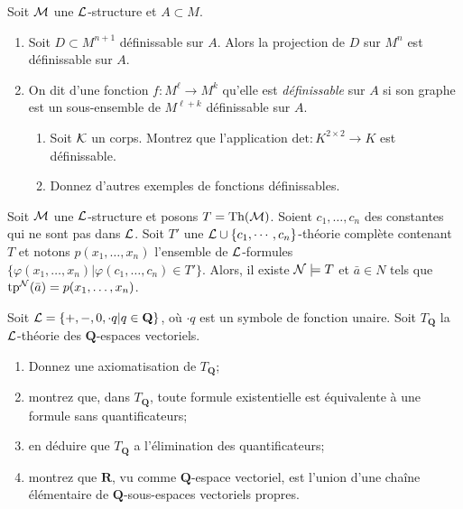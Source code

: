 \documentclass[12pt,a4paper]{exprog}
\renewcommand{\phi}{\varphi}
\begin{document}
\begin{question}
  Soit $\mathcal{M}$ une $\mathcal{L}$-structure et $A\subset M$.
  \begin{enumerate}
  \item Soit $D\subset M^{n+1}$ définissable sur $A$. Alors la projection de $D$
    sur $M^{n}$ est définissable sur $A$.
  \item On dit d'une fonction $f:M^{\ell}\to M^{k}$ qu'elle est
    \emph{définissable} sur $A$ si son graphe est un sous-ensemble de
    $M^{\ell+k}$ définissable sur $A$.
    \begin{enumerate}
    \item Soit $\mathcal{K}$ un corps. Montrez que l'application
      $\text{det}:K^{2\times 2}\to K$ est définissable.
    \item Donnez d'autres exemples de fonctions définissables.
    \end{enumerate}
  \end{enumerate}
\end{question}
\begin{question}
  Soit $\mathcal{M}$ une $\mathcal{L}$-structure et posons $T=\text{Th}(\mathcal{M})$. Soient
  $c_{1},\ldots,c_{n}$ des constantes qui ne sont pas dans $\mathcal{L}$. Soit $T'$ une
  $\mathcal{L}\cup\{c_{1},\cdots,c_{n}\}$-théorie complète contenant $T$ et notons
  $p(x_{1},\ldots,x_{n})$ l'ensemble de $\mathcal{L}$-formules
$\{\phi(x_{1},\ldots,x_{n})|\phi(c_{1},\ldots,c_{n})\in T'\}$. Alors, il existe
$\mathcal{N}\models T$ et $\bar{a}\in N$ tels que $\text{tp}^{\mathcal{N}}(\bar{a})=p(x_{1},\ldots,x_{n})$.
\end{question}
\begin{question}
  Soit $\mathcal{L}=\{+,-,0,\cdot q|q\in\mathbf{Q}\}$, où $\cdot q$ est un symbole de
  fonction unaire. Soit $T_{\mathbf{Q}}$ la $\mathcal{L}$-théorie des
  $\mathbf{Q}$-espaces vectoriels.
  \begin{enumerate}
  \item Donnez une axiomatisation de $T_{\mathbf{Q}}$;
  \item montrez que, dans $T_{\mathbf{Q}}$, toute formule existentielle est
    équivalente à une formule sans quantificateurs;
  \item en déduire que $T_{\mathbf{Q}}$ a l'élimination des quantificateurs;
  \item montrez que $\mathbf{R}$, vu comme $\mathbf{Q}$-espace vectoriel, est
    l'union d'une chaîne élémentaire de $\mathbf{Q}$-sous-espaces vectoriels
    propres.
  \end{enumerate}
\end{question}
\end{document}
